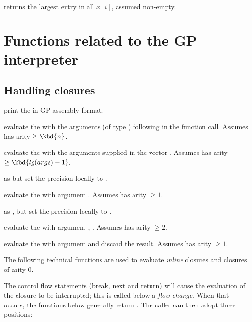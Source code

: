  returns the largest entry in all $x[i]$,
assumed non-empty.

\newpage
\chapter{Functions related to the GP interpreter}

\section{Handling closures}\label{se:closure}


 print the   in
GP assembly format.

 evaluate the 
 with the  arguments (of type ) following  in
the function call. Assumes  has arity $\geq \kbd{n}$.

 evaluate the 
 with the arguments supplied in the vector . Assumes 
has arity $\geq \kbd{lg(args)-1}$.

 as
 but set the precision locally to .

 evaluate the 
 with argument . Assumes  has arity $\geq 1$.

 as
, but set the precision locally to .

 evaluate the 
 with argument , . Assumes  has arity $\geq 2$.

 evaluate the 
 with argument  and discard the result. Assumes 
has arity $\geq 1$.

The following technical functions are used to evaluate \emph{inline}
closures and closures of arity 0.

The control flow statements (break, next and return) will cause the
evaluation of the closure to be interrupted; this is called below a
\emph{flow change}. When that occurs, the functions below generally
 return . The caller can then adopt three positions:

